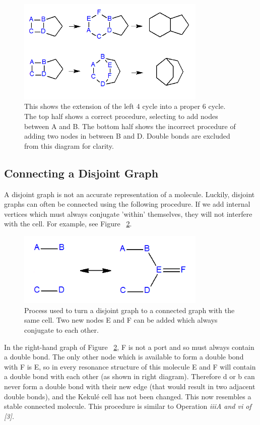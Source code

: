 \documentclass[12pt]{article}
\begin{document}
\begin{figure}[ht!]
\centering
\includegraphics[width=90mm]{cycleExtension.png}
\caption{This shows the extension of the left 4 cycle into a proper 6 cycle. The top half shows a correct procedure, selecting to add nodes between A and B. The bottom half shows the incorrect procedure of adding two nodes in between B and D. Double bonds are excluded from this diagram for clarity.}
\label{fig:cycleExtension}
\end{figure}

\subsection{Connecting a Disjoint Graph}
A disjoint graph is not an accurate representation of a molecule. Luckily, disjoint graphs can often be connected using the following procedure. If we add internal vertices which must always conjugate ’within’ themselves, they will not interfere with the cell. For example, see Figure ~\ref{fig:disjoint}.

\begin{figure}[ht!]
\centering
\includegraphics[width=90mm]{disjoint2.png}
\caption{Process used to turn a disjoint graph to a connected graph with the same cell. Two new nodes E and F can be added which always conjugate to each other.}
\label{fig:disjoint}
\end{figure}

In the right-hand graph of Figure ~\ref{fig:disjoint}, F is not a port and so must always contain a double bond. The only other node which is available to form a double bond with F is E, so in every resonance structure of this molecule E and F will contain a double bond with each other (as shown in right diagram). Therefore d or b can never form a double bond with their new edge (that would result in two adjacent double bonds), and the Kekul\'e cell has not been changed. This now resembles a stable connected molecule. This procedure is similar to Operation \it{iiiA} and \it{vi} of [3].
\end{document}
